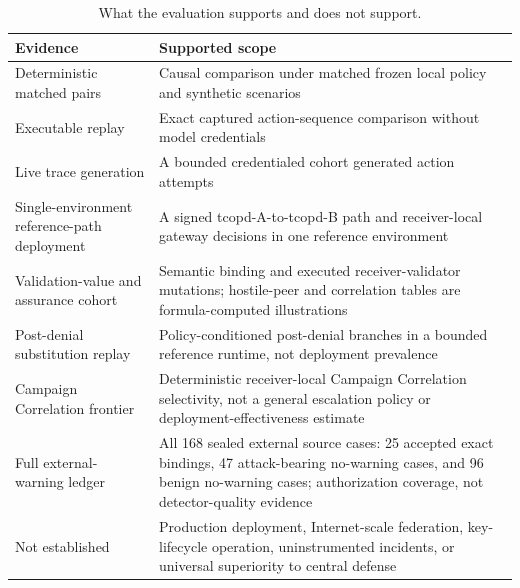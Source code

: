 \begin{table}[t]\centering\small
\caption{What the evaluation supports and does not support.}
\begin{tabular}{p{}p{}}\toprule
Evidence & Supported scope \\ \midrule
Deterministic matched pairs & Causal comparison under matched frozen local policy and synthetic scenarios \\
Executable replay & Exact captured action-sequence comparison without model credentials \\
Live trace generation & A bounded credentialed cohort generated action attempts \\
Single-environment reference-path deployment & A signed tcopd-A-to-tcopd-B path and receiver-local gateway decisions in one reference environment \\
Validation-value and assurance cohort & Semantic binding and executed receiver-validator mutations; hostile-peer and correlation tables are formula-computed illustrations \\
Post-denial substitution replay & Policy-conditioned post-denial branches in a bounded reference runtime, not deployment prevalence \\
Campaign Correlation frontier & Deterministic receiver-local Campaign Correlation selectivity, not a general escalation policy or deployment-effectiveness estimate \\
Full external-warning ledger & All 168 sealed external source cases: 25 accepted exact bindings, 47 attack-bearing no-warning cases, and 96 benign no-warning cases; authorization coverage, not detector-quality evidence \\
Not established & Production deployment, Internet-scale federation, key-lifecycle operation, uninstrumented incidents, or universal superiority to central defense \\ \bottomrule
\end{tabular}\label{tab:limitations}\end{table}
